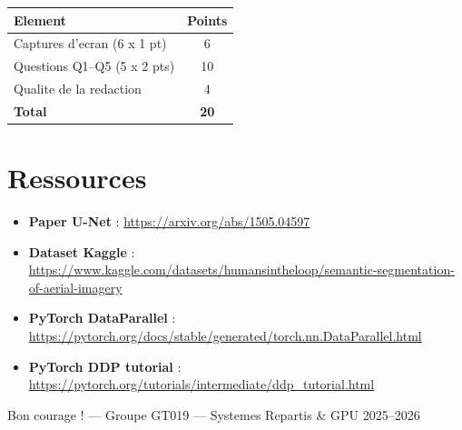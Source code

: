 \documentclass[12pt,a4paper]{article}
\begin{document}
\vspace{0.5em}
\begin{center}
  \begin{tabular}{lc}
    \toprule
    \textbf{Element}                & \textbf{Points} \\
    \midrule
    Captures d'ecran (6 x 1 pt)     & 6  \\
    Questions Q1--Q5 (5 x 2 pts)    & 10 \\
    Qualite de la redaction         & 4  \\
    \midrule
    \textbf{Total}                  & \textbf{20} \\
    \bottomrule
  \end{tabular}
\end{center}

\section{Ressources}

\begin{itemize}[leftmargin=*, itemsep=4pt]
  \item \textbf{Paper U-Net} : \url{https://arxiv.org/abs/1505.04597}
  \item \textbf{Dataset Kaggle} :
        \url{https://www.kaggle.com/datasets/humansintheloop/semantic-segmentation-of-aerial-imagery}
  \item \textbf{PyTorch DataParallel} :
        \url{https://pytorch.org/docs/stable/generated/torch.nn.DataParallel.html}
  \item \textbf{PyTorch DDP tutorial} :
        \url{https://pytorch.org/tutorials/intermediate/ddp_tutorial.html}
\end{itemize}

\vfill
\begin{center}
  \color{gray}\small
  Bon courage ! --- Groupe GT019 --- Systemes Repartis \& GPU 2025--2026
\end{center}
\end{document}
